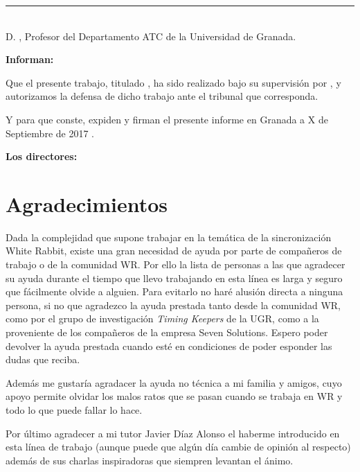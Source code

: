 \noindent\rule[-1ex]{\textwidth}{2pt}\\[4.5ex]

D. \textbf{\myProf}, Profesor del Departamento ATC de la Universidad de Granada.

\vspace{0.5cm}

\textbf{Informan:}

\vspace{0.5cm}

Que el presente trabajo, titulado \textit{\textbf{\myTitle}},
ha sido realizado bajo su supervisión por \textbf{\myName}, y autorizamos la 
defensa de dicho trabajo ante el tribunal que corresponda.

\vspace{0.5cm}

Y para que conste, expiden y firman el presente informe en Granada a X de Septiembre de 2017 .

\vspace{1cm}

\textbf{Los directores:}

\vspace{5cm}

\noindent \textbf{\myProf}

\chapter*{Agradecimientos}
\thispagestyle{empty}

       \vspace{1cm}


Dada la complejidad que supone trabajar en la temática de la sincronización 
White Rabbit, existe una gran necesidad de ayuda por parte de compañeros de 
trabajo o de la comunidad WR. Por ello la lista de personas a las que agradecer 
su ayuda durante el tiempo que llevo trabajando en esta línea es larga y seguro 
que fácilmente olvide a alguien. Para evitarlo no haré alusión directa a 
ninguna persona, si no que agradezco la ayuda prestada tanto desde la comunidad 
WR, como por el grupo de investigación \textit{Timing Keepers} de la UGR, como 
a la proveniente de los compañeros de la empresa Seven Solutions. Espero poder 
devolver la ayuda prestada cuando esté en condiciones de poder esponder las 
dudas que reciba.

Además me gustaría agradacer la ayuda no técnica a mi familia y amigos, cuyo 
apoyo permite olvidar los malos ratos que se pasan cuando se trabaja en WR y 
todo lo que puede fallar lo hace.

Por último agradecer a mi tutor Javier Díaz Alonso el haberme introducido en 
esta línea de trabajo (aunque puede que algún día cambie de opinión al 
respecto) además de sus charlas inspiradoras que siempren levantan el ánimo.

